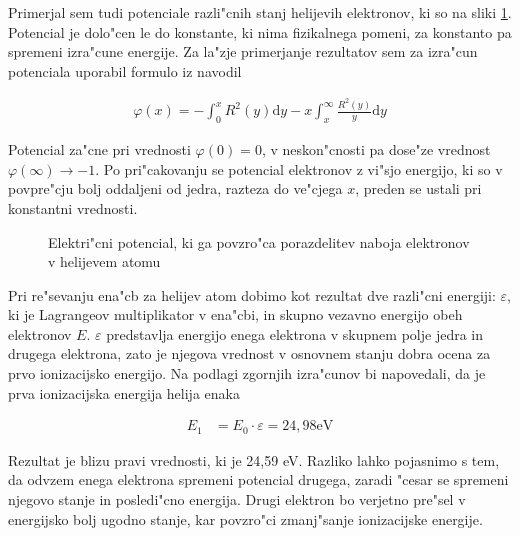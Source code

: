\documentclass[a4paper,10pt]{article}
\newcommand{\dd}{\mathrm{d}}
\begin{document}
Primerjal sem tudi potenciale razli"cnih stanj helijevih elektronov, ki so na sliki \ref{fig:helij-potencial}. Potencial je dolo"cen le do konstante, ki nima fizikalnega pomeni, za konstanto pa spremeni izra"cune energije. Za la"zje primerjanje rezultatov sem za izra"cun potenciala uporabil formulo iz navodil

\begin{align}
 \varphi(x) = -\int_0^x R^2(y) \dd y - x\int_x^\infty \frac{R^2(y)}{y} \dd y
\end{align}

Potencial za"cne pri vrednosti $\varphi(0) = 0$, v neskon"cnosti pa dose"ze vrednost $\varphi(\infty) \to -1$. Po pri"cakovanju se potencial elektronov z vi"sjo energijo, ki so v povpre"cju bolj oddaljeni od jedra, razteza do ve"cjega $x$, preden se ustali pri konstantni vrednosti. 

\begin{figure}[H]
 
 \caption{Elektri"cni potencial, ki ga povzro"ca porazdelitev naboja elektronov v helijevem atomu}
 \label{fig:helij-potencial}
\end{figure}


Pri re"sevanju ena"cb za helijev atom dobimo kot rezultat dve razli"cni energiji: $\varepsilon$, ki je Lagrangeov multiplikator v ena"cbi, in skupno vezavno energijo obeh elektronov $E$. $\varepsilon$ predstavlja energijo enega elektrona v skupnem polje jedra in drugega elektrona, zato je njegova vrednost v osnovnem stanju dobra ocena za prvo ionizacijsko energijo. Na podlagi zgornjih izra"cunov bi napovedali, da je prva ionizacijska energija helija enaka

\begin{align}
 E_1 &= E_0 \cdot \varepsilon = 24,98 \mathrm{eV}
\end{align}

Rezultat je blizu pravi vrednosti, ki je 24,59 eV. Razliko lahko pojasnimo s tem, da odvzem enega elektrona spremeni potencial drugega, zaradi "cesar se spremeni njegovo stanje in posledi"cno energija. Drugi elektron bo verjetno pre"sel v energijsko bolj ugodno stanje, kar povzro"ci zmanj"sanje ionizacijske energije. 
\end{document}
